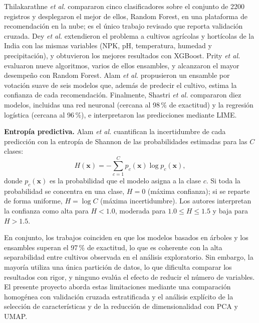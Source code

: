 \documentclass[conference]{IEEEtran}
\begin{document}
Thilakarathne \emph{et al.} \cite{thilakarathne2022} compararon cinco clasificadores sobre el conjunto de 2200 registros y desplegaron el mejor de ellos, Random Forest, en una plataforma de recomendación en la nube; es el único trabajo revisado que reporta validación cruzada. Dey \emph{et al.} \cite{dey2024} extendieron el problema a cultivos agrícolas y hortícolas de la India con las mismas variables (NPK, pH, temperatura, humedad y precipitación), y obtuvieron los mejores resultados con XGBoost. Prity \emph{et al.} \cite{prity2024} evaluaron nueve algoritmos, varios de ellos ensambles, y alcanzaron el mayor desempeño con Random Forest. Alam \emph{et al.} \cite{alam2025} propusieron un ensamble por votación suave de seis modelos que, además de predecir el cultivo, estima la confianza de cada recomendación. Finalmente, Shastri \emph{et al.} \cite{shastri2025} compararon diez modelos, incluidas una red neuronal (cercana al 98\,\% de exactitud) y la regresión logística (cercana al 96\,\%), e interpretaron las predicciones mediante LIME.

\textbf{Entropía predictiva.} Alam \emph{et al.} \cite{alam2025} cuantifican la incertidumbre de cada predicción con la entropía de Shannon de las probabilidades estimadas para las $C$ clases:
\begin{equation}
H(\mathbf{x})=-\sum_{c=1}^{C} p_c(\mathbf{x})\log p_c(\mathbf{x}),
\end{equation}
donde $p_c(\mathbf{x})$ es la probabilidad que el modelo asigna a la clase $c$. Si toda la probabilidad se concentra en una clase, $H=0$ (máxima confianza); si se reparte de forma uniforme, $H=\log C$ (máxima incertidumbre). Los autores interpretan la confianza como alta para $H<1.0$, moderada para $1.0\le H\le1.5$ y baja para $H>1.5$.

En conjunto, los trabajos coinciden en que los modelos basados en árboles y los ensambles superan el 97\,\% de exactitud, lo que es coherente con la alta separabilidad entre cultivos observada en el análisis exploratorio. Sin embargo, la mayoría utiliza una única partición de datos, lo que dificulta comparar los resultados con rigor, y ninguno evalúa el efecto de reducir el número de variables. El presente proyecto aborda estas limitaciones mediante una comparación homogénea con validación cruzada estratificada y el análisis explícito de la selección de características y de la reducción de dimensionalidad con PCA y UMAP.
\end{document}
